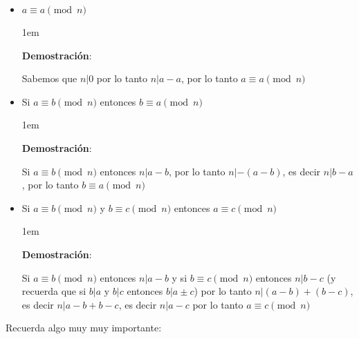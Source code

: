 \documentclass[12pt]{report}                                    %
\newenvironment{SmallIndentation}[1][0.75em]                    %
    {\begin{adjustwidth}{#1}{}\begin{footnotesize}}                 %
    {\end{footnotesize}\end{adjustwidth}}                           %
\begin{document}
            \begin{itemize}
                \item
                    $ a \equiv a \pmod{n}$

                    \begin{SmallIndentation}[1em]
                        \textbf{Demostración}:

                        Sabemos que $n|0$ por lo tanto $n|a-a$, por lo tanto
                        $ a \equiv a \pmod{n}$

                    \end{SmallIndentation}

                \item
                    Si $a \equiv b \pmod{n}$ entonces $b \equiv a \pmod{n}$

                    \begin{SmallIndentation}[1em]
                        \textbf{Demostración}:

                        Si $a \equiv b \pmod{n}$ entonces $n | a - b$, por lo tanto
                        $n | -(a - b)$, es decir $n|b-a$, por lo tanto $b \equiv a \pmod{n}$

                    \end{SmallIndentation}


                \item
                    Si $a \equiv b \pmod{n}$ y $b \equiv c \pmod{n}$ entonces
                    $a \equiv c \pmod{n}$

                    \begin{SmallIndentation}[1em]
                        \textbf{Demostración}:

                        Si $a \equiv b \pmod{n}$ entonces $n | a - b$ y si
                        $b \equiv c \pmod{n}$ entonces $n | b - c$ (y recuerda
                        que si $b|a$ y $b|c$ entonces $b|a \pm c$) por lo tanto
                        $n | (a-b)+(b-c)$, es decir $n|a-b+b-c$, es decir $n|a-c$
                        por lo tanto $a \equiv c \pmod{n}$

                    \end{SmallIndentation}

            \end{itemize}

            Recuerda algo muy muy importante:
\end{document}
